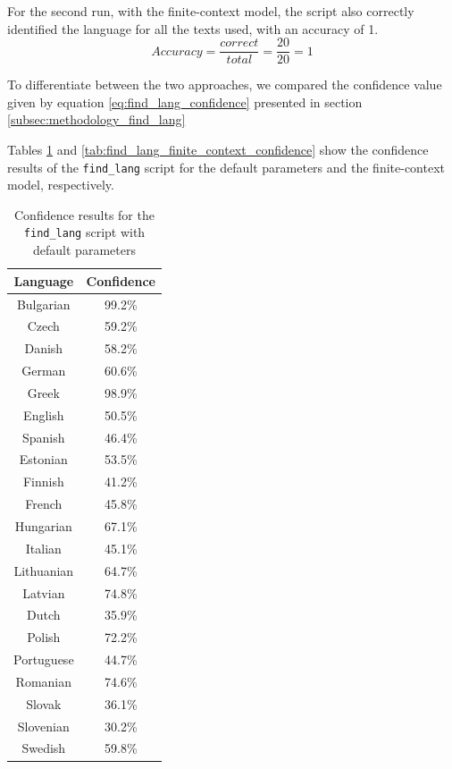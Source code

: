 \documentclass{article}
\begin{document}
For the second run, with the finite-context model, the script also correctly identified the language for all the texts used, with an accuracy of 1.
\begin{equation}
    \label{eq:find_lang_finite_context_accuracy}
    Accuracy = \frac{correct}{total} = \frac{20}{20} = 1
\end{equation}

To differentiate between the two approaches, we compared the confidence value given by equation \ref{eq:find_lang_confidence} presented in section \ref{subsec:methodology_find_lang}

Tables \ref{tab:find_lang_default_confidence} and \ref{tab:find_lang_finite_context_confidence} show the confidence results of the \texttt{find\_lang} script for the default parameters and the finite-context model, respectively.

\begin{table}
    \centering
    \begin{tabular}{|c|c|}
        \hline
        Language & Confidence \\
        \hline
        Bulgarian & 99.2\% \\
        Czech & 59.2\% \\
        Danish & 58.2\% \\
        German & 60.6\% \\
        Greek & 98.9\% \\
        English & 50.5\% \\
        Spanish & 46.4\% \\
        Estonian & 53.5\% \\
        Finnish & 41.2\% \\
        French & 45.8\% \\
        Hungarian & 67.1\% \\
        Italian & 45.1\% \\
        Lithuanian & 64.7\% \\
        Latvian & 74.8\% \\
        Dutch & 35.9\% \\
        Polish & 72.2\% \\
        Portuguese & 44.7\% \\
        Romanian & 74.6\% \\
        Slovak & 36.1\% \\
        Slovenian & 30.2\% \\
        Swedish & 59.8\% \\
        \hline
    \end{tabular}
    \caption{Confidence results for the \texttt{find\_lang} script with default parameters}
    \label{tab:find_lang_default_confidence}
\end{table}
\end{document}
